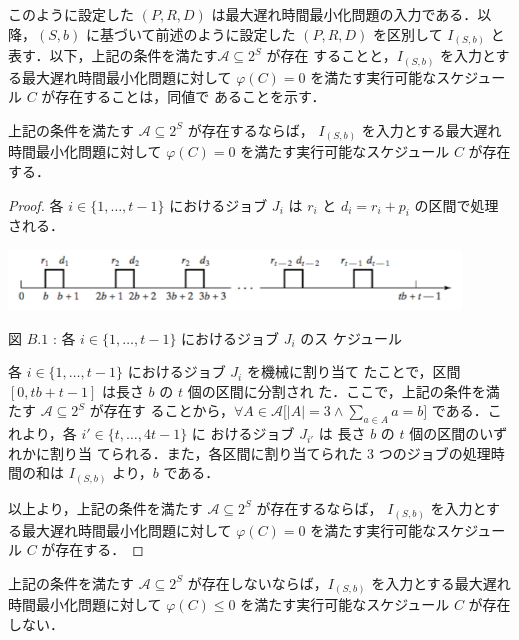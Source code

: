 \documentclass[12pt]{optlab-bachelor}
\begin{document}
このように設定した $(P,R,D)$ は最大遅れ時間最小化問題の入力である．以
降，$(S,b)$ に基づいて前述のように設定した $(P,R,D)$ を区別して
$I_{(S,b)}$ と表す．以下，上記の条件を満たす$\mathcal{A} \subseteq 2^S$ が存在
することと，$I_{(S,b)}$ を入力とする最大遅れ時間最小化問題に対して
$\varphi(C) =  0$
を満たす実行可能なスケジュール $C$ が存在することは，同値で
あることを示す．
\begin{lemma}\label{l_3}
  上記の条件を満たす $\mathcal{A} \subseteq 2^S$ が存在するならば，
  $I_{(S,b)}$ を入力とする最大遅れ時間最小化問題に対して $\varphi(C) =
  0$ を満たす実行可能なスケジュール $C$ が存在する．
\end{lemma}

\begin{proof}
  各 $i \in \{1,\ldots,t - 1\}$ におけるジョブ $J_i$ は $r_i$ と $d_i =
  r_i + p_i$ の区間で処理される．
  \begin{center}
    \includegraphics[width = 12cm]{Lmax1.png}

    図 $B.1$ : 各 $i \in \{1,\ldots,t - 1\}$ におけるジョブ $J_i$ のス
    ケジュール
  \end{center}
  各 $i \in \{1,\ldots,t - 1\}$ におけるジョブ $J_i$ を機械に割り当て
  たことで，区間 $[0,tb + t - 1]$ は長さ $b$ の $t$ 個の区間に分割され
  た．ここで，上記の条件を満たす $\mathcal{A} \subseteq 2^S$ が存在す
  ることから，$\forall A \in \mathcal{A}\big[|A| = 3 \land \sum_{a \in
  A}a = b \big]$ である．これより，各 $i' \in \{t,\ldots,4t - 1\}$ に
  おけるジョブ $J_{i'}$ は 長さ $b$ の $t$ 個の区間のいずれかに割り当
  てられる．また，各区間に割り当てられた 3 つのジョブの処理時間の和は
  $I_{(S,b)}$ より，$b$ である．

  以上より，上記の条件を満たす $\mathcal{A} \subseteq 2^S$ が存在するならば，
  $I_{(S,b)}$ を入力とする最大遅れ時間最小化問題に対して $\varphi(C) =
  0$ を満たす実行可能なスケジュール $C$ が存在する．
\end{proof}

\begin{lemma}\label{l_4}
  上記の条件を満たす $\mathcal{A} \subseteq 2^S$ が存在しないならば，$I_{(S,b)}$ を入力とする最大遅れ時間最小化問題に対して $\varphi(C) \le
  0$ を満たす実行可能なスケジュール $C$ が存在しない．
\end{lemma}
\end{document}

